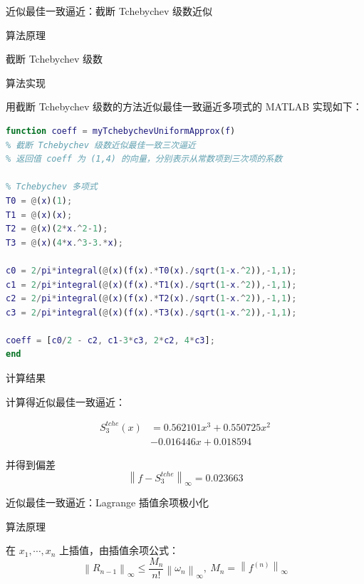 \documentclass[a4paper]{article}
\begin{document}
\begin{multicols}{2}
\begin{section}{近似最佳一致逼近：截断 Tchebychev 级数近似}
\begin{subsection}{算法原理}
\begin{subsubsection}{截断 Tchebychev 级数}
		\end{subsubsection}
		
	\end{subsection}
	
	\begin{subsection}{算法实现}
		
		用截断 Tchebychev 级数的方法近似最佳一致逼近多项式的 MATLAB 实现如下：
		
\begin{lstlisting}[language=Matlab]
function coeff = myTchebychevUniformApprox(f)
% 截断 Tchebychev 级数近似最佳一致三次逼近
% 返回值 coeff 为 (1,4) 的向量，分别表示从常数项到三次项的系数

% Tchebychev 多项式
T0 = @(x)(1);
T1 = @(x)(x);
T2 = @(x)(2*x.^2-1);
T3 = @(x)(4*x.^3-3.*x);

c0 = 2/pi*integral(@(x)(f(x).*T0(x)./sqrt(1-x.^2)),-1,1);
c1 = 2/pi*integral(@(x)(f(x).*T1(x)./sqrt(1-x.^2)),-1,1);
c2 = 2/pi*integral(@(x)(f(x).*T2(x)./sqrt(1-x.^2)),-1,1);
c3 = 2/pi*integral(@(x)(f(x).*T3(x)./sqrt(1-x.^2)),-1,1);

coeff = [c0/2 - c2, c1-3*c3, 2*c2, 4*c3];
end
\end{lstlisting}
		
	\end{subsection}
	
	\begin{subsection}{计算结果}
		
		计算得近似最佳一致逼近：
		
		\begin{equation} \nonumber
			\begin{aligned} S_3^{tche}(x)&=0.562101x^3+0.550725x^2\\&-0.016446x+0.018594 \end{aligned}	
		\end{equation}
		
		并得到偏差 $$\left\|f-S_3^{tche}\right\|_{\infty} = 0.023663$$

	\end{subsection}
	
\end{section}


\begin{section}{近似最佳一致逼近：Lagrange 插值余项极小化}
	
	\begin{subsection}{算法原理}
	
		在 $x_{1}, \cdots, x_{n}$ 上插值，由插值余项公式：$$\left\|R_{n-1}\right\|_{\infty} \leq \frac{M_{n}}{n !}\left\|\omega_{n}\right\|_{\infty}, \ M_{n}=\left\|f^{(n)}\right\|_{\infty}$$
		

\end{subsection}
\end{section}
\end{multicols}
\end{document}
